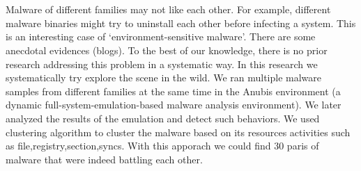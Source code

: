 \chapter{\abstractname}

Malware of different families may not like each other. For example, different malware binaries might try to uninstall each other before infecting a system. This is an interesting case of `environment-sensitive malware'. There are some anecdotal evidences (blogs). To the best of our knowledge, there is no prior research addressing this problem in a systematic way. In this research we systematically try explore the scene in the wild. We ran multiple malware samples from different families at the same time in the Anubis environment (a dynamic full-system-emulation-based malware analysis environment). We later analyzed the results of the emulation and detect such behaviors.
We used clustering algorithm to cluster the malware based on its resources activities such as file,registry,section,syncs. With this apporach we could find 30 paris of malware that were indeed battling each other.



